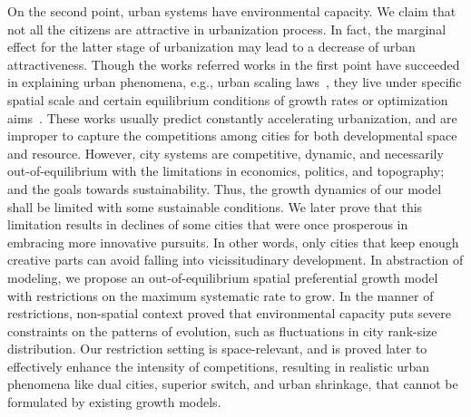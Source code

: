\documentclass[reprint,unsortedaddress,amsmath,amssymb,aps,prl,showkeys]{revtex4-2}
\begin{document}
On the second point, urban systems have environmental capacity. We claim that not all the citizens are attractive in urbanization process. In fact, the marginal effect for the latter stage of urbanization may lead to a decrease of urban attractiveness\cite{atkinson2012urban, girardin2009quantifying,gomez2018explaining,parris2003characterizing,batty2008size}. Though the works referred works in the first point have succeeded in explaining urban phenomena, e.g., urban scaling laws~\cite{bettencourt2007growth,court2013origins,batty2019urbanscalinglaw}, they live under specific spatial scale and certain equilibrium conditions of growth rates or optimization aims~\cite{zipf1949human}. These works usually predict constantly accelerating urbanization, and are improper to capture the competitions among cities for both developmental space and resource. However, city systems are competitive, dynamic, and necessarily out-of-equilibrium with the limitations in economics, politics, and topography; and the goals towards sustainability\cite{fujita1976spatial,louf2014congestion,ccolak2016understanding}. Thus, the growth dynamics of our model shall be limited with some sustainable conditions. We later prove that this limitation results in declines of some cities that were once prosperous in embracing more innovative pursuits\cite{batty2017urban}. In other words, only cities that keep enough creative parts can avoid falling into vicissitudinary development.
In abstraction of modeling, we propose an out-of-equilibrium spatial preferential growth model with restrictions on the maximum systematic rate to grow. In the manner of restrictions, non-spatial context\cite{PhysRevE.55.R3817} proved that environmental capacity puts severe constraints on the patterns of evolution, such as fluctuations in city rank-size distribution. Our restriction setting is space-relevant, and is proved later to effectively enhance the intensity of competitions, resulting in realistic urban phenomena like dual cities\cite{silverman2018rethinking}, superior switch\cite{gabaix2004evolution}, and urban shrinkage\cite{haase2014conceptualizing}, that cannot be formulated by existing growth models. 
\end{document}
